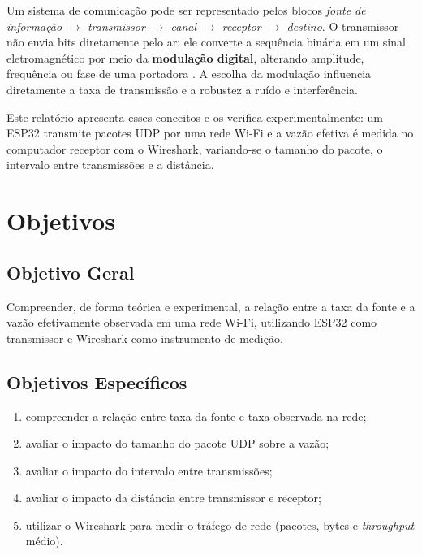 \documentclass[
  12pt,
  a4paper,
  oneside,
  brazil,
  chapter=TITLE,
  section=TITLE,
]{abntex2}
\begin{document}
Um sistema de comunicação pode ser representado pelos blocos
\emph{fonte de informação $\rightarrow$ transmissor $\rightarrow$ canal
$\rightarrow$ receptor $\rightarrow$ destino}. O transmissor não envia bits
diretamente pelo ar: ele converte a sequência binária em um sinal
eletromagnético por meio da \textbf{modulação digital}, alterando amplitude,
frequência ou fase de uma portadora \cite{proakis2007}. A escolha da modulação
influencia diretamente a taxa de transmissão e a robustez a ruído e
interferência.

Este relatório apresenta esses conceitos e os verifica experimentalmente: um
ESP32 transmite pacotes UDP por uma rede Wi-Fi e a vazão efetiva é medida no
computador receptor com o Wireshark, variando-se o tamanho do pacote, o
intervalo entre transmissões e a distância.

\chapter{Objetivos}

\section{Objetivo Geral}
Compreender, de forma teórica e experimental, a relação entre a taxa da fonte e
a vazão efetivamente observada em uma rede Wi-Fi, utilizando ESP32 como
transmissor e Wireshark como instrumento de medição.

\section{Objetivos Específicos}
\begin{enumerate}[label=\alph*)]
  \item compreender a relação entre taxa da fonte e taxa observada na rede;
  \item avaliar o impacto do tamanho do pacote UDP sobre a vazão;
  \item avaliar o impacto do intervalo entre transmissões;
  \item avaliar o impacto da distância entre transmissor e receptor;
  \item utilizar o Wireshark para medir o tráfego de rede (pacotes, bytes e
        \textit{throughput} médio).
\end{enumerate}

\end{document}
